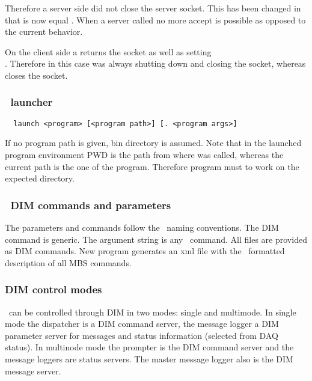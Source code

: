 Therefore a server side  did not close the server socket. This has been changed in that  is now equal . When a server called  no more accept is possible as opposed to the current behavior.

On the client side a  returns the socket as well as setting\\ . Therefore in this case  was always shutting down and closing the socket, whereas  closes the socket.
\subsubsection[MBS launcher]{\mbs\ launcher}
\begin{verbatim}
  launch <program> [<program path>] [. <program args>]
\end{verbatim}
If no program path is given,  bin directory is assumed. Note that in the launched program environment PWD is the path from where  was called, whereas the current path is the one of the program. Therefore program must  to work on the expected directory.
\subsubsection[MBS DIM commands and parameters]{\mbs\ DIM commands and parameters}
The parameters and commands follow the \dabc\ naming conventions. The DIM command  is generic. The argument string is any \mbs\ command. All  files are provided as DIM commands. New program  generates an xml file with the \dabc\ formatted description of all MBS commands.
\subsubsection{DIM control modes}
\mbs\ can be controlled through DIM in two modes: single and multimode. In single mode the dispatcher is a DIM command server, the message logger a DIM parameter server for messages and status information (selected from DAQ status). In multinode mode the prompter is the DIM command server and the message loggers are status servers. The master message logger also is the DIM message server.

